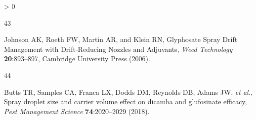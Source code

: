 \documentclass[
  12pt,
  a4paper,
]{article}
\newlength{\cslhangindent}
\newlength{\csllabelwidth}
\newenvironment{CSLReferences}[2] %
 {%
  \setlength{\parindent}{0pt}
  \ifodd #1 \everypar{\setlength{\hangindent}{\cslhangindent}}\ignorespaces\fi
  \ifnum #2 > 0
  \setlength{\parskip}{#2\baselineskip}
  \fi
 }%
 {}
\newcommand{\CSLLeftMargin}[1]{\parbox[t]{\csllabelwidth}{#1}}
\newcommand{\CSLRightInline}[1]{\parbox[t]{\linewidth - \csllabelwidth}{#1}\break}
\begin{document}
\begin{CSLReferences}{1}{0}
\leavevmode\hypertarget{ref-johnson2006}{}%
\CSLLeftMargin{43 }
\CSLRightInline{Johnson AK, Roeth FW, Martin AR, and Klein RN,
Glyphosate {Spray Drift Management} with {Drift}-{Reducing Nozzles} and
{Adjuvants}, \emph{Weed Technology} \textbf{20}:893--897, {Cambridge
University Press} (2006).}

\leavevmode\hypertarget{ref-butts2018}{}%
\CSLLeftMargin{44 }
\CSLRightInline{Butts TR, Samples CA, Franca LX, Dodds DM, Reynolds DB,
Adams JW, \emph{et al.}, Spray droplet size and carrier volume effect on
dicamba and glufosinate efficacy, \emph{Pest Management Science}
\textbf{74}:2020--2029 (2018).}

\end{CSLReferences}
\end{document}
